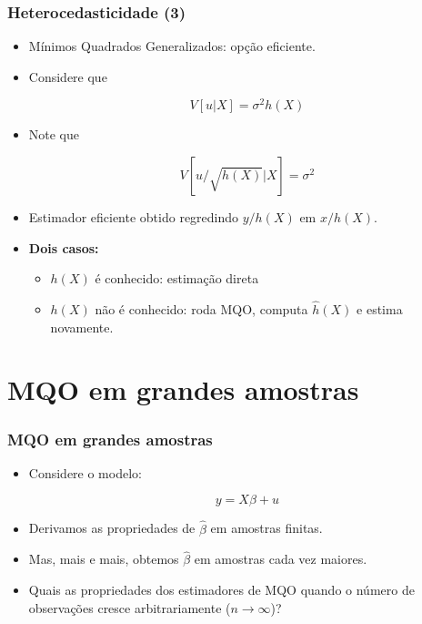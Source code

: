 \documentclass[10pt,slides,xcolor=pdftex,dvipsnames,table]{beamer}
\begin{document}

\begin{frame}[fragile]
	\frametitle{Heterocedasticidade (3)}

\begin{itemize}\itemsep1.2em

\item Mínimos Quadrados Generalizados: opção eficiente. 

\item Considere que 

$$ V [u | X] = \sigma^2 h(X) $$

\item Note que 

$$ V \left[ u / \sqrt{h(X)} | X \right] = \sigma^2$$

\item Estimador eficiente obtido regredindo $y/h(X)$ em $x/h(X)$.

\item \textbf{Dois casos:}
\begin{itemize}
\item $h(X)$ é conhecido: estimação direta
\item $h(X)$ não é conhecido: roda MQO, computa $\hat{h}(X)$ e estima novamente.
\end{itemize}

\end{itemize}

\end{frame}


\section{MQO em grandes amostras}


\begin{frame}[fragile]
	\frametitle{MQO em grandes amostras}

\begin{itemize}\itemsep1.2em 

\item Considere o modelo:

$$ y = X \beta + u $$

\item Derivamos as propriedades de $\widehat{\beta}$ em amostras finitas.       

\item Mas, mais e mais, obtemos $\widehat{\beta}$ em amostras cada vez maiores.

\item Quais as propriedades dos estimadores de MQO quando o número de observações cresce arbitrariamente ($n \rightarrow \infty$)?  

\end{itemize}

\end{frame}
\end{document}
